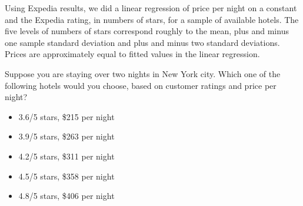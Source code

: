 Using Expedia results, we did a linear regression of price per night on a constant and the Expedia rating, in numbers of stars, for a sample of available hotels.
The five levels of numbers of stars correspond roughly to the mean, plus and minus one sample standard deviation and plus and minus two standard deviations.
Prices are approximately equal to fitted values in the linear regression.

\begin{tcolorbox}
Suppose you are staying over two nights in New York city.
Which one of the following hotels would you choose, based on customer ratings and price per night?

\begin{itemize}
	\item 3.6/5 stars, \$215 per night
	\item 3.9/5 stars, \$263 per night
	\item 4.2/5 stars, \$311 per night
	\item 4.5/5 stars, \$358 per night
	\item 4.8/5 stars, \$406 per night
\end{itemize}
\end{tcolorbox}
